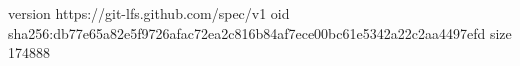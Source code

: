 version https://git-lfs.github.com/spec/v1
oid sha256:db77e65a82e5f9726afac72ea2c816b84af7ece00bc61e5342a22c2aa4497efd
size 174888
